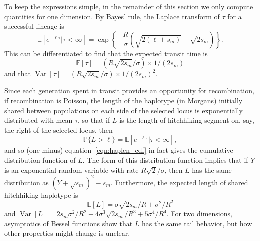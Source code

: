 \documentclass{article}
\DeclareMathOperator{\var}{Var}
\renewcommand{\P}{\mathbb{P}}
\newcommand{\E}{\mathbb{E}}
\newcommand{\plr}[1]{{\it\color{blue}(#1)}}
\begin{document}
To keep the expressions simple, in the remainder of this section we only compute quantities for one dimension.
By Bayes' rule, the Laplace transform of $\tau$ for a successful lineage is
\begin{equation} \label{eqn:haplen_cdf}
\E[e^{-\ell \tau}|\tau<\infty]  = \exp\left\{{-\frac{R}{\sigma}\left(\sqrt{2(\ell+s_m)} - \sqrt{2s_m}\right)}\right\} .
\end{equation}
This can be differentiated to find that the expected transit time is
\begin{equation} 
  \E[\tau] = (R\sqrt{2s_m}/\sigma)\times 1/(2s_m) \label{eqn:mean_tau}
\end{equation}
and that $\var[\tau] = (R\sqrt{2s_m}/\sigma) \times 1/(2s_m)^2$.



Since each generation spent in transit provides an opportunity for recombination,
if recombination is Poisson, the length of the haplotype (in Morgans)
initially shared between populations on each side of the selected locus is exponentially distributed
with mean $\tau$, so that if $L$ is the length of hitchhiking segment on, say, the right of
the selected locus, then
\begin{equation} \label{eqn:haplen_cdf2}
\P\{L>\ell\} = \E[e^{-\ell \tau}|\tau<\infty] ,
\end{equation}
and so (one minus) equation~\eqref{eqn:haplen_cdf} in fact gives the cumulative distribution function of $L$.
The form of this distribution function implies that if $Y$ is an exponential random variable with rate $R\sqrt{2}/\sigma$,
then $L$ has the same distribution as $(Y + \sqrt{s_m})^2 - s_m$.
Furthermore, the expected length of shared hitchhiking haplotype is
\begin{equation} \label{eqn:haplotype_length}
\E[L] = \sigma \sqrt{2s_m}/R + \sigma^2/R^2
\end{equation}
and $\var[L] = 2s_m\sigma^2/R^2 + 4 \sigma^3 \sqrt{2s_m}/R^3 + 5 \sigma^4 / R^4$.
For two dimensions, asymptotics of Bessel functions show that $L$ has the same tail behavior,
but how other properties might change is unclear. 
\end{document}
